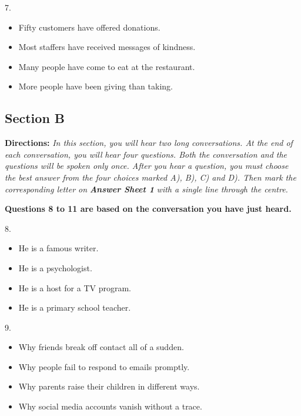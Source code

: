 \documentclass[UTF8,11pt]{ctexart}
\begin{document}
7.


\begin{itemize}[leftmargin=2em,itemsep=.2em,topsep=.4em]\item[A.] Fifty customers have offered donations.
\item[B.] Most staffers have received messages of kindness.
\item[C.] Many people have come to eat at the restaurant.
\item[D.] More people have been giving than taking.
\end{itemize}

\subsection*{\textbf{Section B}}


\textbf{Directions:} \textit{In this section, you will hear two long conversations. At the end of each conversation, you will} \textit{hear four questions. Both the conversation and the questions will be spoken only once. After you hear a} \textit{question, you must choose the best answer from the four choices marked A), B), C) and D). Then mark the} \textit{corresponding letter on }\textbf{\textit{Answer Sheet 1}}\textit{ with a single line through the centre.}


\textbf{Questions 8 to 11 are based on the conversation you have just heard.}


8.


\begin{itemize}[leftmargin=2em,itemsep=.2em,topsep=.4em]\item[A.] He is a famous writer.
\item[B.] He is a psychologist.
\item[C.] He is a host for a TV program.
\item[D.] He is a primary school teacher.
\end{itemize}

9.


\begin{itemize}[leftmargin=2em,itemsep=.2em,topsep=.4em]\item[A.] Why friends break off contact all of a sudden.
\item[B.] Why people fail to respond to emails promptly.
\item[C.] Why parents raise their children in different ways.
\item[D.] Why social media accounts vanish without a trace.
\end{itemize}
\end{document}
